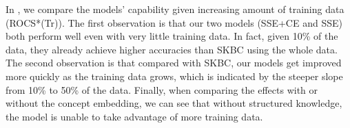 In , we compare the models' capability given increasing
amount of training data (ROCS*(Tr)). The first observation is that our two models (SSE+CE
and SSE) both perform well even with very little training data. In fact,
given 10\% of the data, they already achieve higher accuracies than SKBC using
the whole data. The second observation is that compared with SKBC, our models
get improved more quickly as the training data grows, which is indicated by
the steeper slope from 10\% to 50\% of the data. 
Finally, when comparing the effects with or without the concept embedding, 
we can see that without structured knowledge,
the model is unable to take advantage of more training data. 

